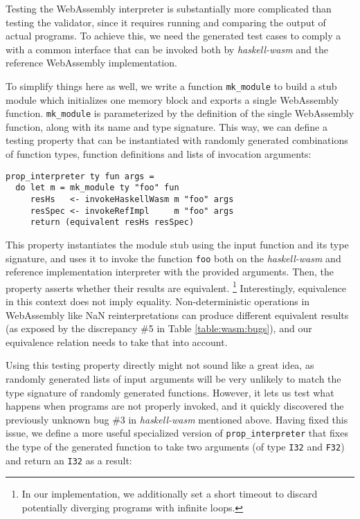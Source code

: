 \documentclass[sigconf, anonymous, review]{acmart}
\begin{document}
Testing the WebAssembly interpreter is substantially more complicated than
testing the validator, since it requires running and comparing the output of
actual programs.
%
To achieve this, we need the generated test cases to comply a with a common
interface that can be invoked both by \textit{haskell-wasm} and the reference
WebAssembly implementation.


To simplify things here as well, we write a function \texttt{mk\_module} to
build a stub module which initializes one memory block and exports a single
WebAssembly function.
%
\texttt{mk\_module} is parameterized by the definition of the single WebAssembly
function, along with its name and type signature.
%
%
%
This way, we can define a testing property that can be instantiated with
randomly generated combinations of function types, function definitions and
lists of invocation arguments:


\begin{verbatim}
prop_interpreter ty fun args =
  do let m = mk_module ty "foo" fun
     resHs   <- invokeHaskellWasm m "foo" args
     resSpec <- invokeRefImpl     m "foo" args
     return (equivalent resHs resSpec)
\end{verbatim}

This property instantiates the module stub using the input function and its type
signature, and uses it to invoke the function \texttt{foo} both on the
\textit{haskell-wasm} and reference implementation interpreter with the provided
arguments.
%
Then, the property asserts whether their results are equivalent.%
%
\footnote{In our implementation, we additionally set a short timeout to discard
  potentially diverging programs with infinite loops.}
%
Interestingly, equivalence in this context does not imply equality.
%
Non-deterministic operations in WebAssembly like NaN reinterpretations can
produce different equivalent results (as exposed by the discrepancy \#5 in Table
\ref{table:wasm:bugs}), and our equivalence relation needs to take that into
account.
%


Using this testing property directly might not sound like a great idea, as
randomly generated lists of input arguments will be very unlikely to match the
type signature of randomly generated functions.
%
However, it lets us test what happens when programs are not properly invoked,
and it quickly discovered the previously unknown bug \#3 in
\textit{haskell-wasm} mentioned above.
%
Having fixed this issue, we define a more useful specialized version of
\texttt{prop\_interpreter} that fixes the type of the generated function to take
two arguments (of type \texttt{I32} and \texttt{F32}) and return an \texttt{I32}
as a result:
\end{document}
